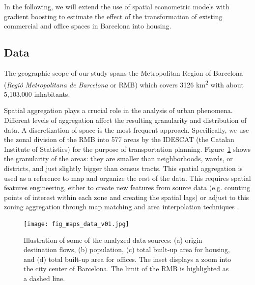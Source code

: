 In the following, we will extend the use of spatial econometric models with gradient boosting to estimate the effect of the transformation of existing commercial and office spaces in Barcelona into housing. 

\subsection{Data}
\label{subsec:ETRCO2H_data}

The geographic scope of our study spans the Metropolitan Region of Barcelona (\emph{Regió Metropolitana de Barcelona} or RMB) which covers 3126 km\textsuperscript{2} with about 5,103,000 inhabitants.

Spatial aggregation plays a crucial role in the analysis of urban phenomena. Different levels of aggregation affect the resulting granularity and distribution of data. A discretization of space is the most frequent approach. 
Specifically, we use the zonal division of the RMB into 577 areas by the IDESCAT (the Catalan Institute of Statistics) for the purpose of transportation planning.
Figure~\ref{fig:data_maps} shows the granularity of the areas:
they are smaller than neighborhoods, wards, or districts, and just slightly bigger than census tracts. 
This spatial aggregation is used as a reference to map and organize the rest of the data. This requires spatial features engineering, either to create new features from source data (e.g. counting points of interest within each zone and creating the spatial lags) or adjust to this zoning aggregation through map matching and area interpolation techniques
\citep{Eicher2001DasymetricEvaluation, Comber2019}. 

\begin{figure}[ht!]
    \centering
    \texttt{[image: fig\_maps\_data\_v01.jpg]}
    \caption{Illustration of some of the analyzed data sources: (a) origin-destination flows, (b) population, (c) total built-up area for housing, and (d) total built-up area for offices. The inset displays a zoom into the city center of Barcelona. The limit of the RMB is highlighted as a dashed line.}
    \label{fig:data_maps}
\end{figure}

